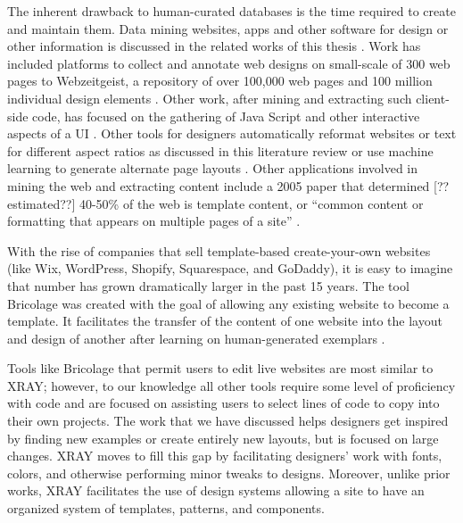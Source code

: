\documentclass{sigchi}
\newcommand{\xray}{XRAY\xspace}
\begin{document}
The inherent drawback to human-curated databases is the time required to create and maintain them. Data mining websites, apps and other software for design or other information is discussed in the related works of this thesis \cite{mining_data_phd_thesis_uc_boulder_alharbi_yeh_2016}. Work has included platforms to collect and annotate web designs on small-scale of 300 web pages \cite{learning_on_web_design_Satyanarayan_CHI_2012} to Webzeitgeist, a repository of over 100,000 web pages and 100 million individual design elements \cite{Webzeitgeist_Kumar_CHI_2013}. Other work, after mining and extracting such client-side code, has focused on the gathering of Java Script and other interactive aspects of a UI \cite{extracting_client_side_web_app_code_Maras_WWW_2012}. 
Other tools for designers automatically reformat websites \cite{compiling_mockups_to_flexible_UIs_Sinha_ESEC-FSE_2013} or text for different aspect ratios as discussed in this literature review \cite{adaptiveGridBasedLayout_Jacobs_SIGGRAPH_2003} or use machine learning to generate alternate page layouts \cite{learning_layouts_single_page_design_o_donovan_IEEE_2014}. Other applications involved in mining the web and extracting content include a 2005 paper that determined [??estimated??] 40-50\% of the web is template content, or ``common content or formatting that appears on multiple pages of a site'' \cite{volume_evolution_web_templates_Gibson_IW3C2_2005}. 

With the rise of companies that sell template-based create-your-own websites (like Wix, WordPress, Shopify, Squarespace, and GoDaddy), it is easy to imagine that number has grown dramatically larger in the past 15 years. The tool Bricolage was created with the goal of allowing any existing website to become a template. It facilitates the transfer of the content of one website into the layout and design of another after learning on human-generated exemplars \cite{bricolage_Kumar_CHI_2011}. 

Tools like Bricolage that permit users to edit live websites are most similar to \xray; however, to our knowledge all other tools require some level of proficiency with code and are focused on assisting users to select lines of code to copy into their own projects. The work that we have discussed helps designers get inspired by finding new examples or create entirely new layouts, but is focused on large changes. \xray moves to fill this gap by facilitating designers' work with fonts, colors, and otherwise performing minor tweaks to designs. Moreover, unlike prior works, \xray facilitates the use of design systems allowing a site to have an organized system of templates, patterns, and components. 
\end{document}
